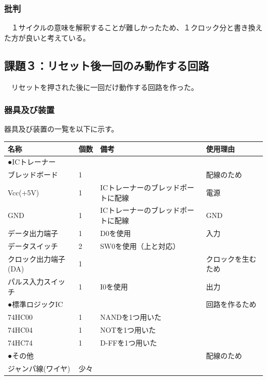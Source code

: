 \documentclass{scrartcl}
\begin{document}
\subsubsection{批判}
\label{sec:org1da2ecb}
　１サイクルの意味を解釈することが難しかったため、１クロック分と書き換えた方が良いと考えている。\\
\subsection{課題３：リセット後一回のみ動作する回路}
\label{sec:orga456987}
　リセットを押された後に一回だけ動作する回路を作った。\\
\subsubsection{器具及び装置}
\label{sec:orga175da5}
器具及び装置の一覧を以下に示す。\\
\begin{center}
\begin{tabular}{|l|l|l|l|}
\hline
名称 & 個数 & 備考 & 使用理由\\
\hline
●ICトレーナー &  &  & \\
ブレッドボード & 1 &  & 配線のため\\
Vcc(+5V) & 1 & ICトレーナーのブレッドポートに配線 & 電源\\
GND & 1 & ICトレーナーのブレッドポートに配線 & GND\\
データ出力端子 & 1 & D0を使用 & 入力\\
データスイッチ & 2 & SW0を使用（上と対応） & \\
クロック出力端子(DA) & 1 &  & クロックを生むため\\
パルス入力スイッチ & 1 & I0を使用 & 出力\\
\hline
●標準ロジックIC &  &  & 回路を作るため\\
74HC00 & 1 & NANDを1つ用いた & \\
74HC04 & 1 & NOTを1つ用いた & \\
74HC74 & 1 & D-FFを1つ用いた & \\
\hline
●その他 &  &  & 配線のため\\
ジャンパ線(ワイヤ) & 少々 &  & \\
\hline
\end{tabular}
\end{center}
\end{document}
